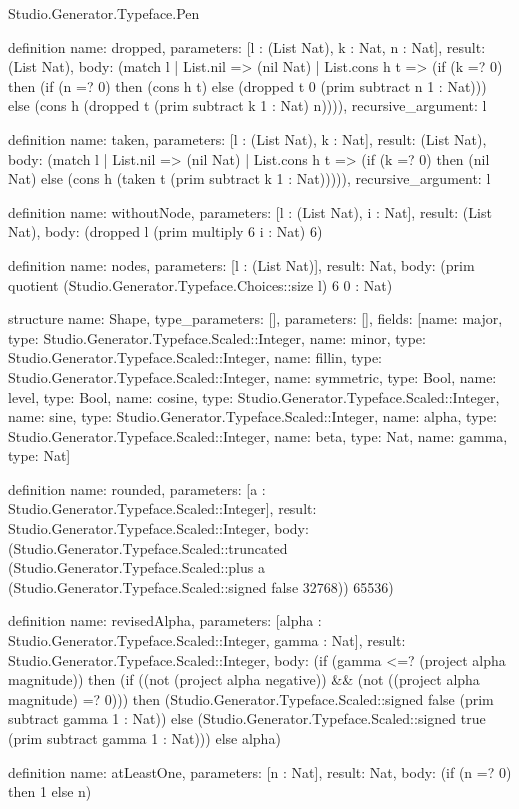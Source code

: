 \begin{lexlean}{Studio.Generator.Typeface.Pen}
\begin{semanticmodule}
definition{
  name: dropped,
  parameters: [l : (List Nat), k : Nat, n : Nat],
  result: (List Nat),
  body: (match l
    | List.nil => (nil Nat)
    | List.cons h t => (if (k =? 0) then (if (n =? 0) then (cons h t) else (dropped t 0 (prim subtract n 1 : Nat))) else (cons h (dropped t (prim subtract k 1 : Nat) n)))),
  recursive_argument: l
}

definition{
  name: taken,
  parameters: [l : (List Nat), k : Nat],
  result: (List Nat),
  body: (match l
    | List.nil => (nil Nat)
    | List.cons h t => (if (k =? 0) then (nil Nat) else (cons h (taken t (prim subtract k 1 : Nat))))),
  recursive_argument: l
}

definition{
  name: withoutNode,
  parameters: [l : (List Nat), i : Nat],
  result: (List Nat),
  body: (dropped l (prim multiply 6 i : Nat) 6)
}

definition{
  name: nodes,
  parameters: [l : (List Nat)],
  result: Nat,
  body: (prim quotient (Studio.Generator.Typeface.Choices::size l) 6 0 : Nat)
}

structure{
  name: Shape,
  type_parameters: [],
  parameters: [],
  fields: [{name: major, type: Studio.Generator.Typeface.Scaled::Integer}, {name: minor, type: Studio.Generator.Typeface.Scaled::Integer}, {name: fillin, type: Studio.Generator.Typeface.Scaled::Integer}, {name: symmetric, type: Bool}, {name: level, type: Bool}, {name: cosine, type: Studio.Generator.Typeface.Scaled::Integer}, {name: sine, type: Studio.Generator.Typeface.Scaled::Integer}, {name: alpha, type: Studio.Generator.Typeface.Scaled::Integer}, {name: beta, type: Nat}, {name: gamma, type: Nat}]
}

definition{
  name: rounded,
  parameters: [a : Studio.Generator.Typeface.Scaled::Integer],
  result: Studio.Generator.Typeface.Scaled::Integer,
  body: (Studio.Generator.Typeface.Scaled::truncated (Studio.Generator.Typeface.Scaled::plus a (Studio.Generator.Typeface.Scaled::signed false 32768)) 65536)
}

definition{
  name: revisedAlpha,
  parameters: [alpha : Studio.Generator.Typeface.Scaled::Integer, gamma : Nat],
  result: Studio.Generator.Typeface.Scaled::Integer,
  body: (if (gamma <=? (project alpha magnitude)) then (if ((not (project alpha negative)) && (not ((project alpha magnitude) =? 0))) then (Studio.Generator.Typeface.Scaled::signed false (prim subtract gamma 1 : Nat)) else (Studio.Generator.Typeface.Scaled::signed true (prim subtract gamma 1 : Nat))) else alpha)
}

definition{
  name: atLeastOne,
  parameters: [n : Nat],
  result: Nat,
  body: (if (n =? 0) then 1 else n)
}


\end{semanticmodule}
\end{lexlean}
